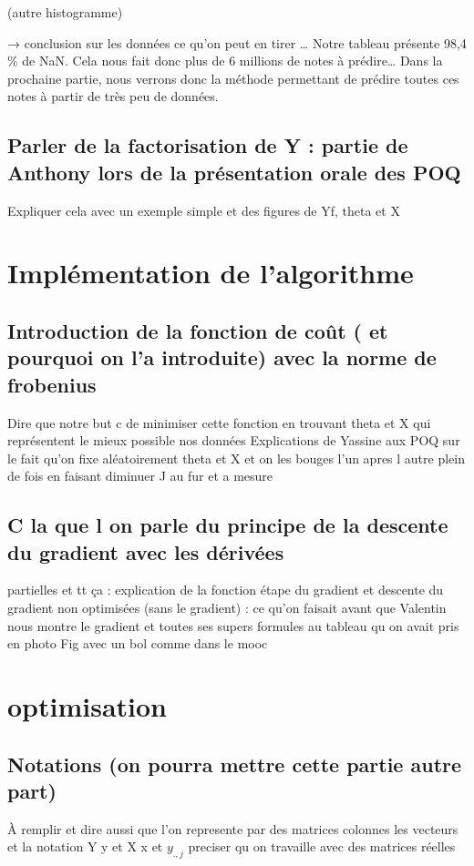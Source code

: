 \documentclass[a4paper,10pt]{article}
\begin{document}
(autre histogramme)

→ conclusion sur les données ce qu’on peut en tirer …
Notre tableau présente 98,4 \% de NaN. Cela nous fait donc plus de 6 millions de notes à prédire… Dans la prochaine partie, nous verrons donc la méthode permettant de prédire toutes ces notes à partir de très peu de données.

\subsection{Parler de la factorisation de Y : partie de Anthony lors de la présentation orale des POQ}
Expliquer cela avec un exemple simple et des figures de Yf, theta et X
\section{Implémentation de l’algorithme}
\subsection{Introduction de la fonction de coût ( et pourquoi on l'a introduite) avec la norme de frobenius}
Dire que notre but c de minimiser cette fonction en trouvant theta et X qui représentent le mieux possible nos données 
    Explications de Yassine aux POQ sur le fait qu’on fixe aléatoirement theta et X et on les bouges l'un apres l autre plein de fois en faisant diminuer J au fur et a mesure
\subsection{C la que l on parle du principe de la descente du gradient avec les dérivées}
partielles et tt ça : explication de la fonction étape du gradient et descente du gradient non optimisées (sans le gradient) : ce qu'on faisait avant que Valentin nous montre le gradient et toutes ses supers formules au tableau qu on avait pris en photo
Fig avec un bol comme dans le mooc
\section{optimisation}

\subsection{Notations (on pourra mettre cette partie autre part)}

\`{A} remplir et dire aussi que l'on represente par des matrices colonnes les vecteurs et la notation Y y et X x et $y_{.,j}$ preciser qu on travaille avec des matrices réelles
\end{document}
